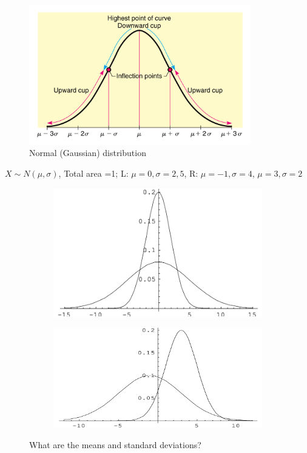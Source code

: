 \documentclass[12pt]{amsart}
\newcommand{\m}{\mu}
\newcommand{\s}{\sigma}
\begin{document}
{\begin{itemize}
\end{itemize}

\begin{figure}[h!]
  \includegraphics[width=3.8in]{img/normal_curve_Brase.png}
  \caption{Normal (Gaussian) distribution}
  \label{fig:normal}
\end{figure}

\color{blue}
$X\sim N(\m,\s)$, Total area =1;  L: $\m=0, \s=2, 5$, R: $\m=-1, \s=4$, $\m=3, \s=2$
\color{black}

\begin{figure}[h!]
  \centering
  \begin{subfigure}[b]{0.37\linewidth}
    \includegraphics[width=\linewidth]{img/normal_curves_compare_v1.png}
  \end{subfigure}
  \begin{subfigure}[b]{0.42\linewidth}
    \includegraphics[width=\linewidth]{img/normal_curves_compare_v2.png}
  \end{subfigure}
  \caption{What are the means and standard deviations?}
\end{figure}


}
\end{document}
